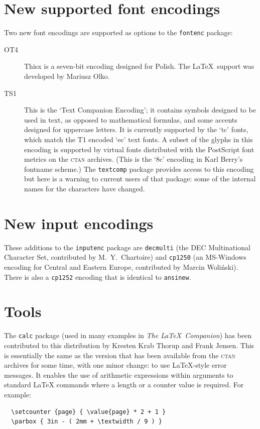 \documentclass{ltnews}
\providecommand\pkg[1]{\texttt{#1}}
\providecommand\option[1]{\texttt{#1}}
\begin{document}
\maketitle

\section{New supported font encodings}

Two new font encodings are supported as options to the \pkg{fontenc}
package:
\begin{description}
\item [OT4]
Thisx is a seven-bit encoding designed for Polish. The \LaTeX\ support
was developed by Mariusz Olko.
\item [TS1] This is the `Text Companion Encoding'; it contains symbols
designed to be used in text, as opposed to mathematical formulas, and
some accents designed for uppercase letters.  It is currently
supported by the `tc' fonts, which match the T1 encoded `ec' text
fonts.  A subset of the glyphs in this encoding is supported by
virtual fonts distributed with the PostScript font metrics on the
\textsc{ctan} archives. (This is the `8c' encoding in Karl Berry's
fontname scheme.)  The \pkg{textcomp} package provides access to
this encoding but here is a warning to current users of that package:
some of the internal names for the characters have changed.
\end{description}


\section{New input encodings}

These additions to the \pkg{inputenc} package are
\option{decmulti} (the DEC Multinational
Character Set,  contributed by M.~Y.~Chartoire)
and \option{cp1250} (an MS-Windows encoding for Central and Eastern
Europe, contributed by Marcin Woli\'nski).  There is also a
\option{cp1252} encoding that is identical to \option{ansinew}.


\section{Tools}

The \pkg{calc} package (used in many examples in \emph{The \LaTeX\
Companion}) has been contributed to this distribution by Kresten Krab
Thorup and Frank Jensen. This is essentially the same as the version
that has been available from the \textsc{ctan} archives for some time,
with one minor change: to use \LaTeX-style error messages.  It enables
the use of arithmetic expressions within arguments to standard
\LaTeX{} commands where a length or a counter value is required.  For
example:
\begin{verbatim}
  \setcounter {page} { \value{page} * 2 + 1 }
  \parbox { 3in - ( 2mm + \textwidth / 9 ) }
\end{verbatim}
\end{document}
